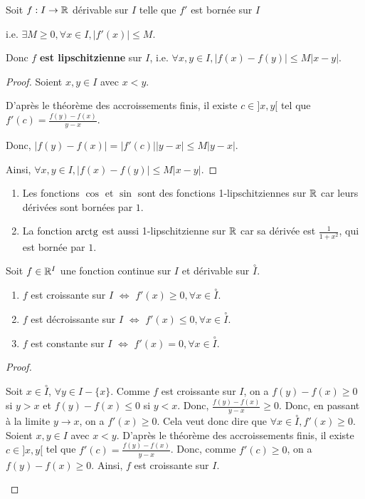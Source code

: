 \documentclass[12pt, a4paper]{report}
\begin{document}
\begin{application}
  Soit $f:I\to\mathbb{R}$ dérivable sur $I$ telle que $f'$ est bornée sur $I$
  
  i.e. $\exists M\geq 0, \forall x\in I, |f'(x)| \leq M$. 
  
  Donc $f$ \textbf{est lipschitzienne} sur $I$, i.e. $\forall x,y\in I, |f(x)-f(y)| \leq M|x-y|$.
\end{application}

\begin{proof}
  Soient $x,y\in I$ avec $x<y$.

  D'après le théorème des accroissements finis, il existe $c\in]x,y[$ tel que $f'(c) = \frac{f(y)-f(x)}{y-x}$.

  Donc, $|f(y)-f(x)| = |f'(c)||y-x| \leq M|y-x|$.

  Ainsi, $\forall x,y\in I, |f(x)-f(y)| \leq M|x-y|$.
\end{proof}

\begin{example}
  \begin{enumerate}
    \item Les fonctions $\cos$ et $\sin$ sont des fonctions 1-lipschitziennes sur $\mathbb{R}$ car leurs dérivées sont bornées par $1$.
    \item La fonction $\mathrm{arctg}$ est aussi 1-lipschitzienne sur $\mathbb{R}$ car sa dérivée est $\frac{1}{1+x^2}$, qui est bornée par $1$.
  \end{enumerate}
\end{example}

\begin{theorem}
  Soit $f \in \mathbb{R}^I$ une fonction continue sur $I$ et dérivable sur $\overset{\circ}{I}$.

  \begin{enumerate}
    \item $f$ est croissante sur $I$ $\iff$ $f'(x) \ge 0, \forall x \in \overset{\circ}{I}$.
    \item $f$ est décroissante sur $I$ $\iff$ $f'(x) \le 0, \forall x \in \overset{\circ}{I}$.
    \item $f$ est constante sur $I$ $\iff$ $f'(x) = 0, \forall x \in \overset{\circ}{I}$.
  \end{enumerate}
\end{theorem}

\begin{proof}
  \begin{outline}
    \1[$\implies$] Soit $x\in\overset{\circ}{I}$, $\forall y \in I-\{x\}$.
    \2 Comme $f$ est croissante sur $I$, on a $f(y) - f(x) \ge 0$ si $y > x$ et $f(y) - f(x) \le 0$ si $y < x$.
    \2 Donc, $\frac{f(y) - f(x)}{y - x} \ge 0$.
    \2 Donc, en passant à la limite $y\to x$, on a $f'(x) \geq 0$.
    \2 Cela veut donc dire que $\forall x \in \overset{\circ}{I}, f'(x) \geq 0$.
    \1[$\impliedby$] Soient $x,y\in I$ avec $x<y$.
    \2 D'après le théorème des accroissements finis, il existe $c\in]x,y[$ tel que $f'(c) = \frac{f(y)-f(x)}{y-x}$.
    \2 Donc, comme $f'(c) \ge 0$, on a $f(y) - f(x) \ge 0$.
    \2 Ainsi, $f$ est croissante sur $I$.
  \end{outline}
\end{proof}
\end{document}
